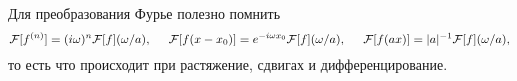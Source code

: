 Для преобразования Фурье полезно помнить
\begin{equation*}
	\mathcal{F}[f^{(n)}] = (i \omega)^n \mathcal{F}[f](\omega/a),
	\hspace{5 mm} 
	\mathcal{F}[f(x-x_0)] = e^{- i \omega x_0} \mathcal{F}[f](\omega/a),
	\hspace{5 mm} 
	\mathcal{F}[f(ax)] = |a|^{-1} \mathcal{F}[f](\omega/a),
\end{equation*}
то есть что происходит при растяжение, сдвигах и дифференцирование. 

